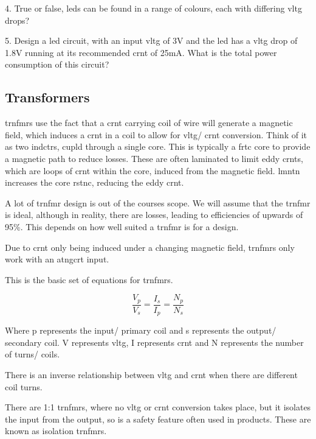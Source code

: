\documentclass[a4paper,11pt]{report}
\newcommand{\Theory}[1] %
{
\phantomsection %
\todo[inline, color=green!30]{\textbf{#1}} %
\vspace{1em} %
}
\begin{document}
4. True or false, \gls{led}s can be found in a range of colours, each with differing \gls{vltg} drops?

5. Design a \gls{led} circuit, with an input \gls{vltg} of 3V and the \gls{led} has a \gls{vltg} drop of 1.8V running at its recommended \gls{crnt} of 25mA. What is the total power consumption of this circuit?

\vspace*{1\baselineskip}

\subsection{Transformers}

\Theory{What are \gls{trnfmr}s?}

\gls{trnfmr}s use the fact that a \gls{crnt} carrying coil of wire will generate a magnetic field, which induces a \gls{crnt} in a coil to allow for \gls{vltg}/ \gls{crnt} conversion. Think of it as two \gls{indctr}s, \gls{cupld} through a single \gls{core}. This is typically a \gls{frtc} \gls{core} to provide a magnetic path to reduce losses. These are often laminated to limit eddy \gls{crnt}s, which are loops of \gls{crnt} within the \gls{core}, induced from the magnetic field. \gls{lmntn} increases the \gls{core} \gls{rstnc}, reducing the eddy \gls{crnt}.

A lot of \gls{trnfmr} design is out of the courses scope. We will assume that the \gls{trnfmr} is ideal, although in reality, there are losses, leading to efficiencies of upwards of 95\%. This depends on how well suited a \gls{trnfmr} is for a design.

Due to \gls{crnt} only being induced under a changing magnetic field, \gls{trnfmr}s only work with an \gls{atngcrt} input.

This is the basic set of equations for \gls{trnfmr}s.

\[\frac{V_p}{V_s} = \frac{I_s}{I_p} = \frac{N_p}{N_s}\]

Where p represents the input/ primary coil and s represents the output/ secondary coil. V represents \gls{vltg}, I represents \gls{crnt} and N represents the number of turns/ coils.

There is an inverse relationship between \gls{vltg} and \gls{crnt} when there are different coil turns.

There are 1:1 \gls{trnfmr}s, where no \gls{vltg} or \gls{crnt} conversion takes place, but it isolates the input from the output, so is a safety feature often used in products. These are known as isolation \gls{trnfmr}s.
\end{document}
